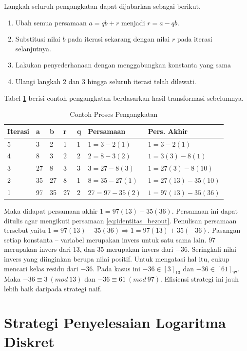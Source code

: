 Langkah seluruh pengangkatan dapat dijabarkan sebagai berikut.
\begin{enumerate}
\item Ubah semua persamaan $ a=qb+r $ menjadi $ r=a-qb $.
\item Substitusi nilai $ b $ pada iterasi sekarang dengan nilai $ r $ pada iterasi selanjutnya.
\item Lakukan penyederhanaan dengan menggabungkan konstanta yang sama
\item Ulangi langkah 2 dan 3 hingga seluruh iterasi telah dilewati.
\end{enumerate}

Tabel \ref{tab:pengangkatan_ext_euclid} berisi contoh pengangkatan berdasarkan hasil transformasi sebelumnya.

\begin{table}[h!]
\small
\Centering
\caption{Contoh Proses Pengangkatan}
\label{tab:pengangkatan_ext_euclid}
\begin{tabular} { |l|l|l|l|l|l|l| }
	\hline
	Iterasi	& a		& b		& r		& q		& Persamaan			& Pers. Akhir \\
	\hline
	5		& 3		& 2		& 1		& 1		& $ 1 = 3 - 2(1) $		& $ 1 = 3 - 2(1) $ \\
	4		& 8		& 3		& 2		& 2		& $ 2 = 8 - 3(2) $		& $ 1 = 3(3) - 8(1) $ \\
	3		& 27	& 8		& 3		& 3		& $ 3 = 27 - 8(3) $ 	& $ 1 = 27(3) - 8(10) $ \\
	2		& 35	& 27	& 8		& 1		& $ 8 = 35 - 27(1) $	& $ 1 = 27(13) - 35(10) $ \\
	1		& 97	& 35	& 27	& 2		& $ 27 = 97 - 35(2) $	& $ 1 = 97(13) - 35(36) $ \\
	\hline
\end{tabular}
\end{table}

Maka didapat persamaan akhir $ 1=97(13)-35(36) $. Persamaan ini dapat ditulis agar mengikuti persamaan \eqref{eq:identitas_bezout}. Penulisan persamaan tersebut yaitu $ 1=97(13)-35(36) \Rightarrow 1=97(13)+35(-36) $. Pasangan setiap konstanta -- variabel merupakan invers untuk satu sama lain. $ 97 $ merupakan invers dari $ 13 $, dan $ 35 $ merupakan invers dari $ -36 $. Seringkali nilai invers yang diinginkan berupa nilai positif. Untuk mengatasi hal itu, cukup mencari kelas residu dari $ -36 $. Pada kasus ini $ -36\in[3]_{13}$ dan $ -36\in[61]_{97} $. Maka $ -36\equiv3\ (mod\ 13) $ dan $ -36\equiv61\ (mod\ 97) $.
Efisiensi strategi ini jauh lebih baik daripada strategi naif.

\section{Strategi Penyelesaian Logaritma Diskret}


